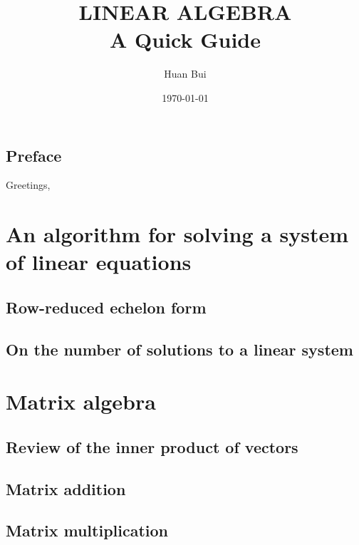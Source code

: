 \documentclass{article}
\theoremstyle{definition}
\begin{document}
	\begin{titlepage}\centering
		\clearpage
		\title{\textsc{\bf{LINEAR ALGEBRA}}\\\smallskip A Quick Guide\\}
		\author{\bigskip Huan Bui}
		\date{\today}
		\maketitle
		\thispagestyle{empty}
	\end{titlepage}

\newpage

\subsection*{Preface}

Greetings,\\


\newpage
\tableofcontents
\newpage

\section{An algorithm for solving a system of linear equations}
\subsection{Row-reduced echelon form}
\subsection{On the number of solutions to a linear system}

\newpage

\section{Matrix algebra}
\subsection{Review of the inner product of vectors}
\subsection{Matrix addition}
\subsection{Matrix multiplication}
\end{document}
